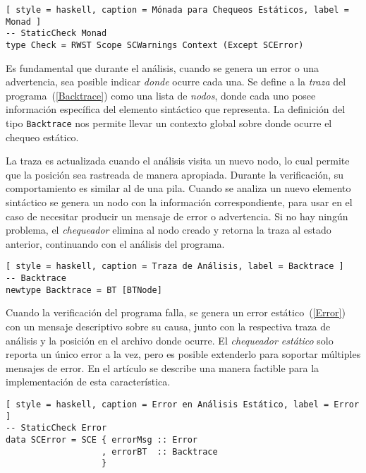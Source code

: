 \begin{lstlisting}[ style = haskell, caption = Mónada para Chequeos Estáticos, label = Monad ]
-- StaticCheck Monad
type Check = RWST Scope SCWarnings Context (Except SCError)
\end{lstlisting}

Es fundamental que durante el análisis, cuando se genera un error o una advertencia, sea posible indicar \textit{donde} ocurre cada una.
Se define a la \textit{traza} del programa~(\ref{Backtrace}) como una lista de \textit{nodos}, donde cada uno posee información específica del elemento sintáctico que representa.
La definición del tipo \lstinline[style = haskell]{Backtrace} nos permite llevar un contexto global sobre donde ocurre el chequeo estático.

La traza es actualizada cuando el análisis visita un nuevo nodo, lo cual permite que la posición sea rastreada de manera apropiada.
Durante la verificación, su comportamiento es similar al de una pila.
Cuando se analiza un nuevo elemento sintáctico se genera un nodo con la información correspondiente, para usar en el caso de necesitar producir un mensaje de error o advertencia.
Si no hay ningún problema, el \textit{chequeador} elimina al nodo creado y retorna la traza al estado anterior, continuando con el análisis del programa.

\begin{lstlisting}[ style = haskell, caption = Traza de Análisis, label = Backtrace ]
-- Backtrace
newtype Backtrace = BT [BTNode]
\end{lstlisting}

Cuando la verificación del programa falla, se genera un error estático~(\ref{Error}) con un mensaje descriptivo sobre su causa, junto con la respectiva traza de análisis y la posición en el archivo donde ocurre.
El \textit{chequeador estático} solo reporta un único error a la vez, pero es posible extenderlo para soportar múltiples mensajes de error.
En el artículo se describe una manera factible para la implementación de esta característica.

\begin{lstlisting}[ style = haskell, caption = Error en Análisis Estático, label = Error ]
-- StaticCheck Error
data SCError = SCE { errorMsg :: Error
                   , errorBT  :: Backtrace
                   }
\end{lstlisting}

